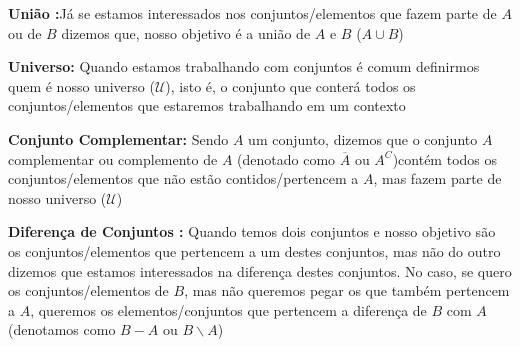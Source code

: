     \textbf{União :}Já se estamos interessados nos conjuntos/elementos que fazem parte de $A$ ou de $B$ dizemos que, nosso objetivo é a união de $A$ e $B$ ($A \cup B$)%
    
    
    \textbf{Universo:} Quando estamos trabalhando com conjuntos é comum definirmos quem é nosso universo ($ \mathcal U $), isto é, o conjunto que conterá todos os conjuntos/elementos que estaremos trabalhando em um contexto%
    
    
    \textbf{Conjunto Complementar:} Sendo $A$ um conjunto, dizemos que o conjunto $A$ complementar ou complemento de $A$ (denotado como $\overline A$ ou $A^C$)contém todos os conjuntos/elementos que não estão contidos/pertencem a $A$, mas fazem parte de nosso universo ($\mathcal U$)%
    
    
    \textbf{Diferença de Conjuntos :} Quando temos dois conjuntos e nosso objetivo são os conjuntos/elementos que pertencem a um destes conjuntos, mas não do outro dizemos que estamos interessados na diferença destes conjuntos. No caso, se quero os conjuntos/elementos de $B$, mas não queremos pegar os que também pertencem a $A$, queremos os elementos/conjuntos que pertencem a diferença de $B$ com $A$ (denotamos como $B-A$ ou $B \backslash A$)%
    
    
